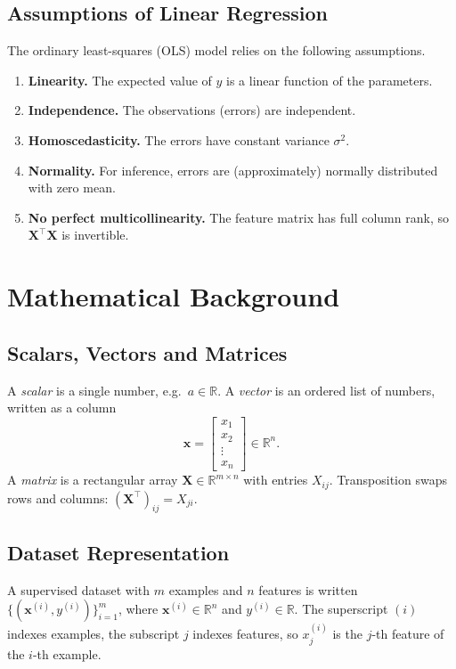 \documentclass[11pt,a4paper]{report}
\theoremstyle{definition}
\theoremstyle{plain}
\theoremstyle{remark}
\newcommand{\R}{\mathbb{R}}
\newcommand{\vx}{\mathbf{x}}
\newcommand{\Xmat}{\mathbf{X}}
\begin{document}
	\section{Assumptions of Linear Regression}
	The ordinary least-squares (OLS) model relies on the following assumptions.
	\begin{enumerate}[nosep]
		\item \textbf{Linearity.} The expected value of $y$ is a linear function of
		the parameters.
		\item \textbf{Independence.} The observations (errors) are independent.
		\item \textbf{Homoscedasticity.} The errors have constant variance
		$\sigma^2$.
		\item \textbf{Normality.} For inference, errors are (approximately) normally
		distributed with zero mean.
		\item \textbf{No perfect multicollinearity.} The feature matrix has full
		column rank, so $\Xmat^{\!\top}\Xmat$ is invertible.
	\end{enumerate}
	
	\chapter{Mathematical Background}
	
	\section{Scalars, Vectors and Matrices}
	A \emph{scalar} is a single number, e.g.\ $a\in\R$. A \emph{vector} is an
	ordered list of numbers, written as a column
	\[
	\vx=\begin{bmatrix}x_1\\x_2\\\vdots\\x_n\end{bmatrix}\in\R^{n}.
	\]
	A \emph{matrix} is a rectangular array $\Xmat\in\R^{m\times n}$ with entries
	$X_{ij}$. Transposition swaps rows and columns: $(\Xmat^{\!\top})_{ij}=X_{ji}$.
	
	\section{Dataset Representation}
	A supervised dataset with $m$ examples and $n$ features is written
	$\{(\vx^{(i)},y^{(i)})\}_{i=1}^{m}$, where $\vx^{(i)}\in\R^{n}$ and
	$y^{(i)}\in\R$. The superscript $(i)$ indexes examples, the subscript $j$
	indexes features, so $x^{(i)}_j$ is the $j$-th feature of the $i$-th example.
	
\end{document}
